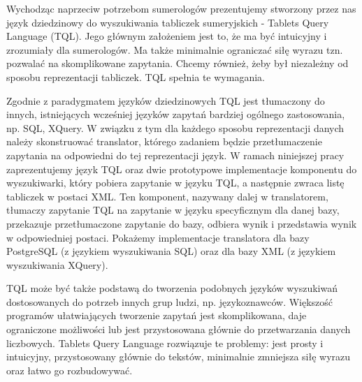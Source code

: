 


Wychodząc naprzeciw potrzebom sumerologów prezentujemy stworzony przez nas język dziedzinowy do wyszukiwania tabliczek sumeryjskich - Tablets Query Language (TQL). Jego głównym założeniem jest to, że ma być intuicyjny i zrozumiały dla sumerologów. Ma także minimalnie ograniczać siłę wyrazu tzn. pozwalać na skomplikowane zapytania. Chcemy również, żeby był niezależny od sposobu reprezentacji tabliczek. TQL spełnia te wymagania. 

Zgodnie z paradygmatem języków dziedzinowych TQL jest tłumaczony do innych, istniejących wcześniej języków zapytań bardziej ogólnego zastosowania, np. SQL, XQuery.
W związku z tym dla każdego sposobu reprezentacji danych należy skonstruować translator, 
którego zadaniem będzie przetłumaczenie zapytania na odpowiedni do tej reprezentacji język. 
W ramach niniejszej pracy zaprezentujemy język TQL oraz dwie prototypowe implementacje komponentu do wyszukiwarki, który pobiera zapytanie w języku TQL, a następnie zwraca listę tabliczek w postaci XML.
Ten komponent, nazywany dalej w translatorem, tłumaczy zapytanie TQL na zapytanie w języku specyficznym dla danej bazy, przekazuje przetłumaczone zapytanie do bazy, odbiera wynik i przedstawia wynik w odpowiedniej postaci. Pokażemy implementacje translatora dla bazy PostgreSQL (z językiem wyszukiwania SQL) oraz dla bazy XML (z językiem wyszukiwania XQuery).






TQL może być także podstawą do tworzenia podobnych języków wyszukiwań dostosowanych do potrzeb innych grup ludzi, np. językoznawców.
Większość programów ułatwiających tworzenie zapytań jest skomplikowana, daje ograniczone możliwości lub jest przystosowana głównie do przetwarzania danych liczbowych. Tablets Query Language rozwiązuje te problemy: jest prosty i intuicyjny, przystosowany głównie do tekstów, minimalnie zmniejsza siłę wyrazu oraz łatwo go rozbudowywać. 



